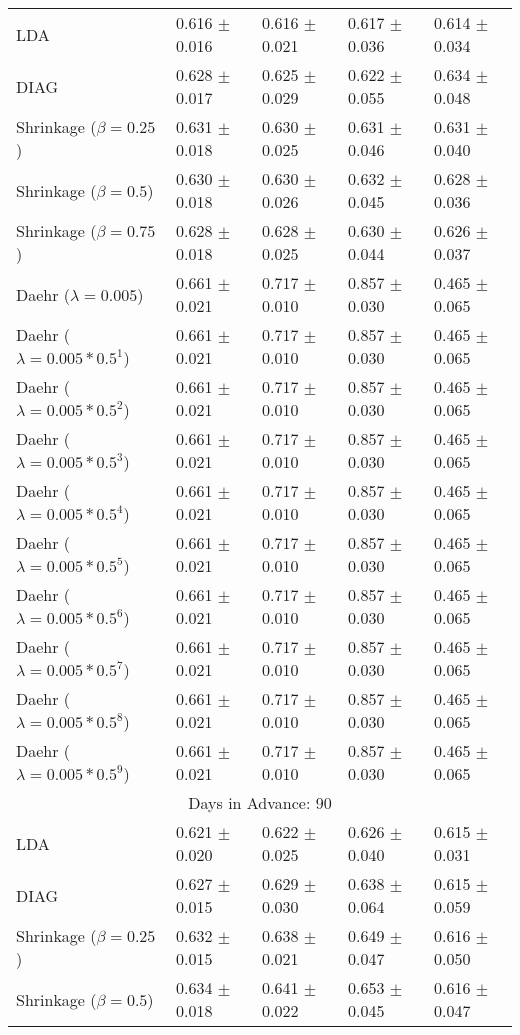 \begin{table}
\begin{tabular}{*{5}{l}}
LDA&0.616 $\pm$ 0.016&0.616 $\pm$ 0.021&0.617 $\pm$ 0.036&0.614 $\pm$ 0.034\\
DIAG&0.628 $\pm$ 0.017&0.625 $\pm$ 0.029&0.622 $\pm$ 0.055&0.634 $\pm$ 0.048\\
Shrinkage ($\beta=0.25$)&0.631 $\pm$ 0.018&0.630 $\pm$ 0.025&0.631 $\pm$ 0.046&0.631 $\pm$ 0.040\\
Shrinkage ($\beta=0.5$)&0.630 $\pm$ 0.018&0.630 $\pm$ 0.026&0.632 $\pm$ 0.045&0.628 $\pm$ 0.036\\
Shrinkage ($\beta=0.75$)&0.628 $\pm$ 0.018&0.628 $\pm$ 0.025&0.630 $\pm$ 0.044&0.626 $\pm$ 0.037\\
Daehr ($\lambda=0.005$)&0.661 $\pm$ 0.021&0.717 $\pm$ 0.010&0.857 $\pm$ 0.030&0.465 $\pm$ 0.065\\
Daehr ($\lambda=0.005*0.5^1$)&0.661 $\pm$ 0.021&0.717 $\pm$ 0.010&0.857 $\pm$ 0.030&0.465 $\pm$ 0.065\\
Daehr ($\lambda=0.005*0.5^2$)&0.661 $\pm$ 0.021&0.717 $\pm$ 0.010&0.857 $\pm$ 0.030&0.465 $\pm$ 0.065\\
Daehr ($\lambda=0.005*0.5^3$)&0.661 $\pm$ 0.021&0.717 $\pm$ 0.010&0.857 $\pm$ 0.030&0.465 $\pm$ 0.065\\
Daehr ($\lambda=0.005*0.5^4$)&0.661 $\pm$ 0.021&0.717 $\pm$ 0.010&0.857 $\pm$ 0.030&0.465 $\pm$ 0.065\\
Daehr ($\lambda=0.005*0.5^5$)&0.661 $\pm$ 0.021&0.717 $\pm$ 0.010&0.857 $\pm$ 0.030&0.465 $\pm$ 0.065\\
Daehr ($\lambda=0.005*0.5^6$)&0.661 $\pm$ 0.021&0.717 $\pm$ 0.010&0.857 $\pm$ 0.030&0.465 $\pm$ 0.065\\
Daehr ($\lambda=0.005*0.5^7$)&0.661 $\pm$ 0.021&0.717 $\pm$ 0.010&0.857 $\pm$ 0.030&0.465 $\pm$ 0.065\\
Daehr ($\lambda=0.005*0.5^8$)&0.661 $\pm$ 0.021&0.717 $\pm$ 0.010&0.857 $\pm$ 0.030&0.465 $\pm$ 0.065\\
Daehr ($\lambda=0.005*0.5^9$)&0.661 $\pm$ 0.021&0.717 $\pm$ 0.010&0.857 $\pm$ 0.030&0.465 $\pm$ 0.065\\
\hline\multicolumn{5}{c}{  Days in Advance: 90}\\\hline
LDA&0.621 $\pm$ 0.020&0.622 $\pm$ 0.025&0.626 $\pm$ 0.040&0.615 $\pm$ 0.031\\
DIAG&0.627 $\pm$ 0.015&0.629 $\pm$ 0.030&0.638 $\pm$ 0.064&0.615 $\pm$ 0.059\\
Shrinkage ($\beta=0.25$)&0.632 $\pm$ 0.015&0.638 $\pm$ 0.021&0.649 $\pm$ 0.047&0.616 $\pm$ 0.050\\
Shrinkage ($\beta=0.5$)&0.634 $\pm$ 0.018&0.641 $\pm$ 0.022&0.653 $\pm$ 0.045&0.616 $\pm$ 0.047\\

\end{tabular}
\end{table}
